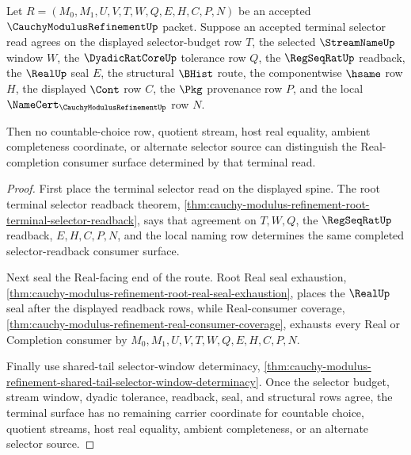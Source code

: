 \begin{theorem}
\label{thm:cauchy-modulus-refinement-terminal-spine-choice-refusal}
Let $R=(M_0,M_1,U,V,T,W,Q,E,H,C,P,N)$ be an accepted $\CauchyModulusRefinementUp$ packet. Suppose an accepted terminal selector read agrees on the displayed selector-budget row $T$, the selected $\StreamNameUp$ window $W$, the $\DyadicRatCoreUp$ tolerance row $Q$, the $\RegSeqRatUp$ readback, the $\RealUp$ seal $E$, the structural $\BHist$ route, the componentwise $\hsame$ row $H$, the displayed $\Cont$ row $C$, the $\Pkg$ provenance row $P$, and the local $\NameCert_{\CauchyModulusRefinementUp}$ row $N$.

Then no countable-choice row, quotient stream, host real equality, ambient completeness coordinate, or alternate selector source can distinguish the Real-completion consumer surface determined by that terminal read.
\end{theorem}
\begin{proof}
First place the terminal selector read on the displayed spine. The root terminal selector readback theorem, \autoref{thm:cauchy-modulus-refinement-root-terminal-selector-readback}, says that agreement on $T,W,Q$, the $\RegSeqRatUp$ readback, $E,H,C,P,N$, and the local naming row determines the same completed selector-readback consumer surface.

Next seal the Real-facing end of the route. Root Real seal exhaustion, \autoref{thm:cauchy-modulus-refinement-root-real-seal-exhaustion}, places the $\RealUp$ seal after the displayed readback rows, while Real-consumer coverage, \autoref{thm:cauchy-modulus-refinement-real-consumer-coverage}, exhausts every Real or Completion consumer by $M_0,M_1,U,V,T,W,Q,E,H,C,P,N$.

Finally use shared-tail selector-window determinacy, \autoref{thm:cauchy-modulus-refinement-shared-tail-selector-window-determinacy}. Once the selector budget, stream window, dyadic tolerance, readback, seal, and structural rows agree, the terminal surface has no remaining carrier coordinate for countable choice, quotient streams, host real equality, ambient completeness, or an alternate selector source.
\end{proof}

